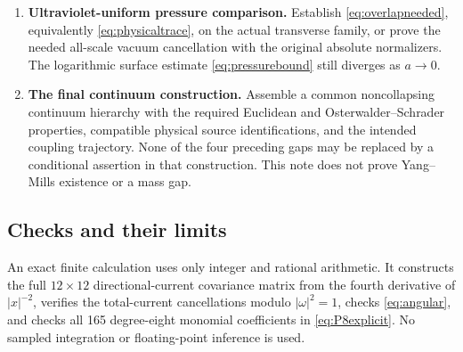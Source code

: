 \documentclass[11pt,letterpaper]{article}
\theoremstyle{plain}
\theoremstyle{remark}\newtheorem{remark}[theorem]{Scope}
\begin{document}
\begin{enumerate}
\item \textbf{Ultraviolet-uniform pressure comparison.}
Establish \eqref{eq:overlapneeded}, equivalently \eqref{eq:physicaltrace},
on the actual transverse family, or prove the needed all-scale vacuum
cancellation with the original absolute normalizers. The logarithmic surface
estimate \eqref{eq:pressurebound} still diverges as $a\to0$.

\item \textbf{The final continuum construction.}
Assemble a common noncollapsing continuum hierarchy with the required Euclidean
and Osterwalder--Schrader properties, compatible physical source identifications,
and the intended coupling trajectory. None of the four preceding gaps may be
replaced by a conditional assertion in that construction. This note
does not prove Yang--Mills existence or a mass gap.
\end{enumerate}

\subsection{Checks and their limits}

An exact finite calculation uses only
integer and rational arithmetic. It constructs the full $12\times12$
directional-current covariance matrix from the fourth derivative of $|x|^{-2}$, verifies the
total-current cancellations modulo $|\omega|^2=1$, checks
\eqref{eq:angular}, and checks all 165 degree-eight monomial coefficients in
\eqref{eq:P8explicit}. No sampled integration or floating-point inference is used.
\end{document}
